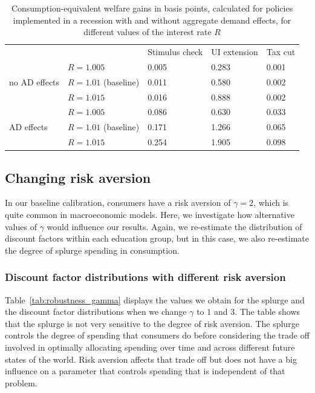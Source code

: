 \documentclass[../HAFiscal]{subfiles}
\begin{document}
\begin{table}[]
	\begin{center}
		\begin{tabular}{@{}lllll@{}}
			\toprule
			&                    & Stimulus check & UI extension & Tax cut \\ \cmidrule(l){1-5} 
			\multirow{3}{*}{no AD effects}            	& $R = 1.005$ 			& 0.005        & 0.283       & 0.001	\\
			& $R = 1.01$ (baseline) & 0.011        & 0.580       & 0.002   	\\
			& $R = 1.015$ 			& 0.016        & 0.888       & 0.002   	\\ \cmidrule(l){1-5}
			\multirow{3}{*}{AD effects}					& $R = 1.005$    		& 0.086        & 0.630       & 0.033  	\\		
			& $R = 1.01$ (baseline) & 0.171        & 1.266       & 0.065   	\\
			& $R = 1.015$    		& 0.254        & 1.905       & 0.098    \\ \cmidrule(l){1-5} 
		\end{tabular}
		\caption{Consumption-equivalent welfare gains in basis points, calculated for policies implemented in a recession with and without aggregate demand effects, for different values of the interest rate $R$}
		\label{tab:robustness_R_results}
	\end{center}
\end{table}


\FloatBarrier
\subsection{Changing risk aversion} 
\label{sec:robust_gamma} 

In our baseline calibration, consumers have a risk aversion of $\gamma=2$, which is quite common in macroeconomic models. Here, we investigate how alternative values of $\gamma$ would influence our results. Again, we re-estimate the distribution of discount factors within each education group, but in this case, we also re-estimate the degree of splurge spending in consumption. 

\subsubsection{Discount factor distributions with different risk aversion}
\label{sec:robust_gamma_estim}

Table~\ref{tab:robustness_gamma} displays the values we obtain for the splurge and the discount factor distributions when we change $\gamma$ to $1$ and $3$. The table shows that the splurge is not very sensitive to the degree of risk aversion. The splurge controls the degree of spending that consumers do before considering the trade off involved in optimally allocating spending over time and across different future states of the world. Risk aversion affects that trade off but does not have a big influence on a parameter that controls spending that is independent of that problem. 
\end{document}
